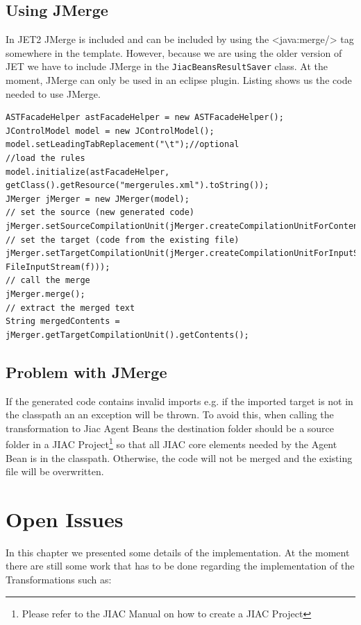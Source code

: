 \subsection{Using JMerge}
In JET2 JMerge is included and can be included by using the <java:merge/> tag somewhere in the template. However, because we are using the older version of JET we have to include JMerge in the \verb|JiacBeansResultSaver| class. At the moment, JMerge can only be used in an eclipse plugin. Listing shows us the code needed to use JMerge.
\begin{lstlisting}
ASTFacadeHelper astFacadeHelper = new ASTFacadeHelper();
JControlModel model = new JControlModel(); 
model.setLeadingTabReplacement("\t");//optional
//load the rules
model.initialize(astFacadeHelper, getClass().getResource("mergerules.xml").toString());
JMerger jMerger = new JMerger(model); 
// set the source (new generated code)
jMerger.setSourceCompilationUnit(jMerger.createCompilationUnitForContents(content));
// set the target (code from the existing file)
jMerger.setTargetCompilationUnit(jMerger.createCompilationUnitForInputStream(new FileInputStream(f))); 
// call the merge
jMerger.merge(); 
// extract the merged text
String mergedContents = jMerger.getTargetCompilationUnit().getContents();
\end{lstlisting}

\subsection{Problem with JMerge}
If the generated code contains invalid imports e.g. if the imported target is not in the classpath an an exception will be thrown. 
To avoid this, when calling the transformation to Jiac Agent Beans the destination folder should be a source folder in a JIAC Project\footnote{Please refer to the JIAC Manual\cite{JIACMAN10} on how to create a JIAC Project} so that all JIAC core elements needed by the Agent Bean is in the classpath. Otherwise, the code will not be merged and the existing file will be overwritten. 
\section{Open Issues}
\label{sec:opi}
In this chapter we presented some details of the implementation. At the moment there are still some work that has to be done regarding the implementation of the Transformations such as:

